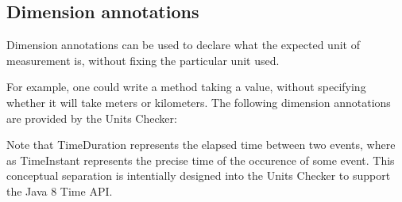 \subsection{Dimension annotations\label{unit-dimension-annotations}}

Dimension annotations can be used to declare what the expected unit of
measurement is, without fixing the particular unit used.

For example, one could write a method taking a  value, without
specifying whether it will take meters or kilometers. The following dimension
annotations are provided by the Units Checker:

\begin{description}
\item[]

\item[]

\item[]

\item[]

\item[]

\item[]

\item[]

\item[]

\item[]

\item[]

\item[]

\item[]

\item[]
\end{description}

Note that TimeDuration represents the elapsed time between two events, where as
TimeInstant represents the precise time of the occurence of some event. This
conceptual separation is intentially designed into the Units Checker to support
the Java 8 Time API.

